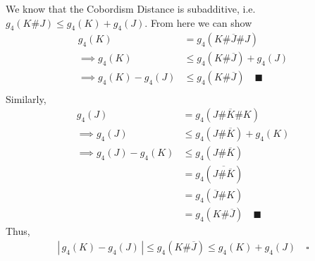 \documentclass[10pt]{article}
\begin{document}
We know that the Cobordism Distance is subadditive, i.e.
$g_4(K\#J) \leq g_4(K) + g_4(J)$. From here we can show
\begin{align*}
    g_4(K) &= g_4(K \# \overline{J} \# J) \\
    \implies g_4(K) &\leq g_4(K \# \overline{J}) + g_4(J) \\
    \implies g_4(K) - g_4(J) &\leq g_4(K \# \overline{J}) \quad \blacksquare \\
\end{align*}
Similarly,
\begin{align*}
    g_4(J) &= g_4(J \# \overline{K} \# K) \\
    \implies g_4(J) &\leq g_4(J \# \overline{K}) + g_4(K) \\
    \implies g_4(J) - g_4(K) &\leq g_4(J \# \overline{K}) \\
    &= g_4(\overline{J \# \overline{K}}) \\
    &= g_4(\overline{J} \# K) \\
    &= g_4(K \# \overline{J}) \quad \blacksquare
\end{align*}
Thus,
\begin{align*}
    \left|\, g_4(K) - g_4(J) \,\right| \leq g_4(K \# \overline{J}) \leq g_4(K) + g_4(J) \quad \square
\end{align*}



\end{document}
